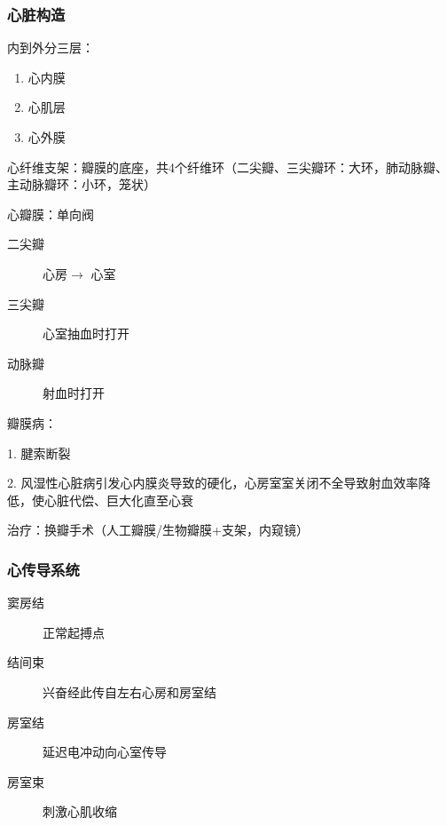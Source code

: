 \subsubsection*{心脏构造}%
\label{subsub:心脏构造}
内到外分三层：
\begin{enumerate}
    \item 心内膜
    \item 心肌层
    \item 心外膜
\end{enumerate}
\begin{notation}
心纤维支架：瓣膜的底座，共4个纤维环（二尖瓣、三尖瓣环：大环，肺动脉瓣、主动脉瓣环：小环，笼状）
\end{notation}
\begin{notation}
心瓣膜：单向阀
\begin{description}
    \item[二尖瓣] 心房$\to $ 心室
    \item [三尖瓣] 心室抽血时打开
    \item [动脉瓣] 射血时打开
\end{description}
\end{notation}
\begin{notation}
瓣膜病：

1. 腱索断裂

2. 风湿性心脏病引发心内膜炎导致的硬化，心房室室关闭不全导致射血效率降低，使心脏代偿、巨大化直至心衰

治疗：换瓣手术（人工瓣膜/生物瓣膜+支架，内窥镜）
\end{notation}
\subsubsection*{心传导系统}%
\label{subsub:心传导系统}
\begin{description}
    \item[窦房结] 正常起搏点
    \item [结间束] 兴奋经此传自左右心房和房室结
    \item [房室结] 延迟电冲动向心室传导
    \item [房室束] 刺激心肌收缩
\end{description}
